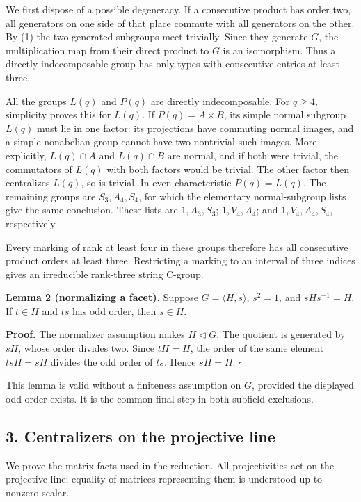 \documentclass[
  11pt,
  a4paper,
]{article}
\begin{document}
We first dispose of a possible degeneracy. If a consecutive product has
order two, all generators on one side of that place commute with all
generators on the other. By (1) the two generated subgroups meet
trivially. Since they generate \(G\), the multiplication map from their
direct product to \(G\) is an isomorphism. Thus a directly
indecomposable group has only types with consecutive entries at least
three.

All the groups \(L(q)\) and \(P(q)\) are directly indecomposable. For
\(q\ge4\), simplicity proves this for \(L(q)\). If \(P(q)=A\times B\),
its simple normal subgroup \(L(q)\) must lie in one factor: its
projections have commuting normal images, and a simple nonabelian group
cannot have two nontrivial such images. More explicitly, \(L(q)\cap A\)
and \(L(q)\cap B\) are normal, and if both were trivial, the commutators
of \(L(q)\) with both factors would be trivial. The other factor then
centralizes \(L(q)\), so is trivial. In even characteristic
\(P(q)=L(q)\). The remaining groups are \(S_3,A_4,S_4\), for which the
elementary normal-subgroup lists give the same conclusion. These lists
are \(1,A_3,S_3\); \(1,V_4,A_4\); and \(1,V_4,A_4,S_4\), respectively.

Every marking of rank at least four in these groups therefore has all
consecutive product orders at least three. Restricting a marking to an
interval of three indices gives an irreducible rank-three string
C-group.

\textbf{Lemma 2 (normalizing a facet).} Suppose
\(G=\langle H,s\rangle\), \(s^2=1\), and \(sHs^{-1}=H\). If \(t\in H\)
and \(ts\) has odd order, then \(s\in H\).

\textbf{Proof.} The normalizer assumption makes \(H\triangleleft G\).
The quotient is generated by \(sH\), whose order divides two. Since
\(tH=H\), the order of the same element \(tsH=sH\) divides the odd order
of \(ts\). Hence \(sH=H\). \(\square\)

This lemma is valid without a finiteness assumption on \(G\), provided
the displayed odd order exists. It is the common final step in both
subfield exclusions.

\subsection{3. Centralizers on the projective
line}\label{centralizers-on-the-projective-line}

We prove the matrix facts used in the reduction. All projectivities act
on the projective line; equality of matrices representing them is
understood up to nonzero scalar.
\end{document}
